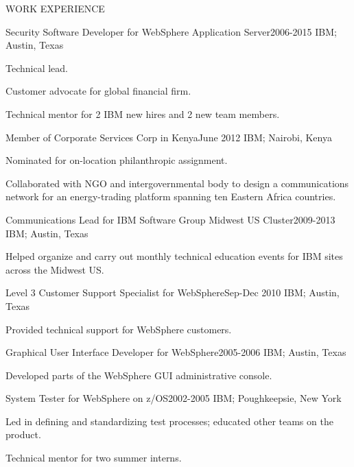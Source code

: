 \documentclass{resume} %
\begin{document}
\begin{rSection}{WORK EXPERIENCE}\itemsep -10pt  
\begin{rSubsection}{Security Software Developer for WebSphere Application Server}{2006-2015} {IBM; Austin, Texas} {}
\item Technical lead.
\item Customer advocate for global financial firm.
\item Technical mentor for 2 IBM new hires and 2 new team members.
\end{rSubsection}

\begin{rSubsection}{Member of Corporate Services Corp in Kenya}{June 2012} {IBM; Nairobi, Kenya}{}
\item Nominated for on-location philanthropic assignment.
\item Collaborated with NGO and intergovernmental body to design a communications network for an energy-trading platform spanning ten Eastern Africa countries.
\end{rSubsection}

\begin{rSubsection}{Communications Lead for IBM Software Group Midwest US Cluster}{2009-2013} {IBM; Austin, Texas}{}
\item Helped organize and carry out monthly technical education events for IBM sites across the Midwest US.
\end{rSubsection}

\begin{rSubsection}{Level 3 Customer Support Specialist for WebSphere}{Sep-Dec 2010} {IBM; Austin, Texas}{}
\item Provided technical support for WebSphere customers.
\end{rSubsection}

\begin{rSubsection}{Graphical User Interface Developer for WebSphere}{2005-2006} {IBM; Austin, Texas}{}
\item Developed parts of the WebSphere GUI administrative console.
\end{rSubsection}

\begin{rSubsection}{System Tester for WebSphere on z/OS}{2002-2005} {IBM; Poughkeepsie, New York}{}
\item Led in defining and standardizing test processes; educated other teams on the product.
\item Technical mentor for two summer interns.
\end{rSubsection}
\end{rSection}
\newpage
\end{document}

